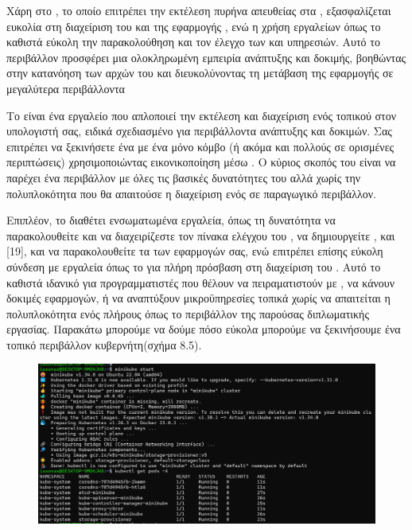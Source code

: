 Χάρη στο , το οποίο επιτρέπει την εκτέλεση  
πυρήνα απευθείας στα , 
εξασφαλίζεται ευκολία στη διαχείριση του  
και της εφαρμογής , 
ενώ η χρήση εργαλείων όπως το  
καθιστά εύκολη την παρακολούθηση και τον έλεγχο των  
και υπηρεσιών. Αυτό το περιβάλλον προσφέρει μια ολοκληρωμένη 
εμπειρία ανάπτυξης και δοκιμής, βοηθώντας στην κατανόηση των 
αρχών του  και διευκολύνοντας τη μετάβαση της 
εφαρμογής σε μεγαλύτερα  περιβάλλοντα

Το  είναι ένα εργαλείο που απλοποιεί την εκτέλεση και 
διαχείριση ενός τοπικού  στον υπολογιστή σας,
ειδικά σχεδιασμένο για περιβάλλοντα ανάπτυξης και δοκιμών. 
Σας επιτρέπει να ξεκινήσετε ένα  
με ένα μόνο κόμβο (ή ακόμα και πολλούς σε ορισμένες περιπτώσεις) 
χρησιμοποιώντας εικονικοποίηση μέσω . 
Ο κύριος σκοπός του  είναι να παρέχει ένα περιβάλλον  
με όλες τις βασικές δυνατότητες του  
αλλά χωρίς την πολυπλοκότητα που θα απαιτούσε η διαχείριση ενός 
σε παραγωγικό περιβάλλον.

Επιπλέον, το  
διαθέτει ενσωματωμένα εργαλεία, όπως τη δυνατότητα να παρακολουθείτε
και να διαχειρίζεστε τον πίνακα ελέγχου του , 
να δημιουργείτε , και [19], και 
να παρακολουθείτε τα  των εφαρμογών σας, ενώ επιτρέπει 
επίσης εύκολη σύνδεση με εργαλεία όπως το  
για πλήρη πρόσβαση στη διαχείριση του . 
Αυτό το καθιστά ιδανικό για προγραμματιστές που θέλουν να 
πειραματιστούν με , 
να κάνουν δοκιμές εφαρμογών, ή να αναπτύξουν μικροϋπηρεσίες 
τοπικά χωρίς να απαιτείται η πολυπλοκότητα ενός πλήρους 
όπως το περιβάλλον της παρούσας διπλωματικής εργασίας. Παρακάτω μπορούμε να δούμε 
πόσο εύκολα μπορούμε να ξεκινήσουμε ένα τοπικό περιβάλλον κυβερνήτη(σχήμα 8.5).


\begin{figure}[h]
	\centering
	\includegraphics[width=1.0\textwidth]{graphics/minikube_deployment_k8s.png}
	\caption{}
\end{figure}

